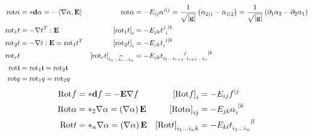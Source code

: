 \documentclass[a4paper,7pt]{scrartcl}
\newcommand{\exd}{\mathbf{d}}
\newcommand{\rot}{\mathrm{rot}}
\newcommand{\Rot}{\mathrm{Rot}}
\newcommand{\gb}{\mathbf{g}}
\newcommand{\Eb}{\mathbf{E}}
\newcommand{\tsym}{\mathfrak{t}}
\begin{document}
\begin{align*}
  \rot\alpha &= *\exd\alpha = -\left\langle \nabla\alpha , \Eb \right\rangle
          & \rot\alpha &= -E_{ij}\alpha^{i|j} = \frac{1}{\sqrt{|\gb|}}\left( \alpha_{2|1} - \alpha_{1|2} \right)
                                              = \frac{1}{\sqrt{|\gb|}}\left( \partial_{1}\alpha_{2} - \partial_{2}\alpha_{1} \right) \\
  \rot_{1}t &= -\nabla t^{T} :\Eb
          &\left[ \rot_{1}t \right]_{i} &= -E_{jk}\tensor{t}{^{j}_{i}^{|k}} \\
  \rot_{2}t &= -\nabla t : \Eb = \rot_{1}t^{T}
          &\left[ \rot_{2}t \right]_{i} &= -E_{jk}\tensor{t}{_{i}^{j|k}}\\
  \rot_{r}t &
          &\left[ \rot_{r}t \right]_{i_{1}\ldots \widehat{i_{r}} \ldots i_{n}} &= -E_{jk}\tensor{t}{_{i_{1}\ldots i_{r-1}}^{j}_{i_{r+1}\ldots i_{n}}^{|k}} \\
  \rot \tsym &= \rot_{1} \tsym = \rot_{2} \tsym\\
  \rot q &= \rot_{1} q = \rot_{2} q
\end{align*}
\begin{align*}
  \Rot f &= *\exd f = -\Eb\nabla f
          &\left[ \Rot f \right]_{i} &= -E_{ij}f^{|j} \\
  \Rot\alpha &= *_{2}\nabla\alpha = \left( \nabla\alpha \right) \Eb
             &\left[ \Rot\alpha \right]_{ij} &= -E_{jk}\tensor{\alpha}{_{i}^{|k}}\\
  \Rot t &=  *_{n}\nabla\alpha = \left( \nabla\alpha \right) \Eb
             &\left[ \Rot t \right]_{i_{1} \ldots i_{n} k} &= -E_{kl}\tensor{t}{_{i_{1} \ldots i_{n}}^{|l}}
\end{align*}
\end{document}

